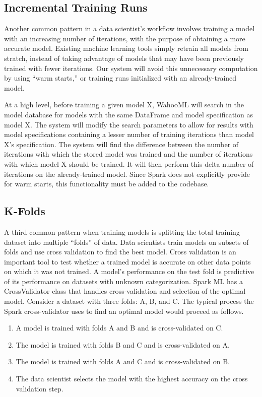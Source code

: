 \documentclass[../proposal.tex]{subfiles}
\begin{document}
\subsection{Incremental Training Runs}

Another common pattern in a data scientist's workflow involves training a model
with an increasing number of iterations, with the purpose of obtaining a more
accurate model. Existing machine learning tools simply retrain all models from
stratch, instead of taking advantage of models that may have been previously
trained with fewer iterations. Our system will avoid this unnecessary
computation by using ``warm starts,'' or training runs initialized with an
already-trained model.

At a high level, before training a given model X, WahooML will search in the
model database for models with the same DataFrame and model specification as
model X. The system will modify the search parameters to allow for results with
model specifications containing a lesser number of training iterations than
model X's specification. The system will find the difference between the number
of iterations with which the stored model was trained and the number of
iterations with which model X should be trained. It will then perform this
delta number of iterations on the already-trained model. Since Spark does not
explicitly provide for warm starts, this functionality must be added to the
codebase.

\subsection{K-Folds}

A third common pattern when training models is splitting the total training
dataset into multiple ``folds'' of data. Data scientists train models on
subsets of folds and use cross validation to find the best model. Cross
validation is an important tool to test whether a trained model is accurate on
other data points on which it was not trained. A model's performance on the
test fold is predictive of its performance on datasets with unknown
categorization. Spark ML has a CrossValidator class that handles
cross-validation and selection of the optimal model. Consider a dataset with
three folds: A, B, and C. The typical process the Spark cross-validator uses to
find an optimal model would proceed as follows.

\begin{enumerate}[topsep=0pt,itemsep=-1ex,partopsep=1ex,parsep=1ex]
\item A model is trained with folds A and B and is cross-validated on C.
\item The model is trained with folds B and C and is cross-validated on A.
\item The model is trained with folds A and C and is cross-validated on B.

\item The data scientist selects the model with the highest accuracy on the
cross validation step.
\end{enumerate}
\end{document}
